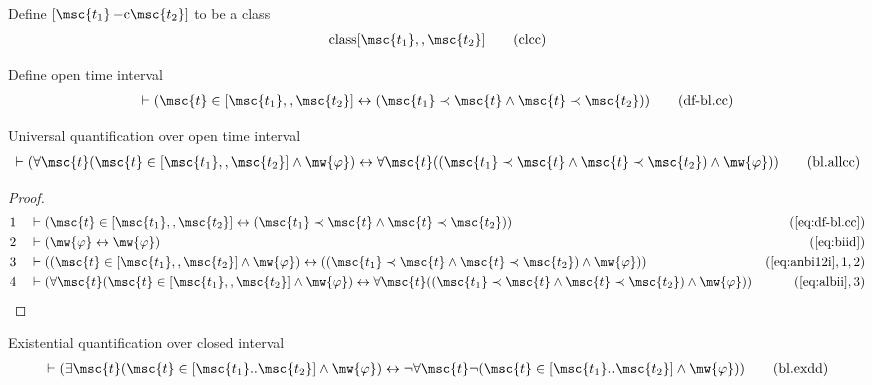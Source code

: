 \begin{metadefinition} Define $[ \msc{t_1} \,\mathrm{{\tt -}c}
\msc{t_2} ]$ to be a class
\begin{align}
{\rm class} [ \msc{t_1} ,, \msc{t_2} ]\label{eq:clcc}\tag{clcc}
\end{align}
\end{metadefinition}

\begin{metadefinition} Define open time interval
\begin{align}
\vdash ( \msc{t} \in [ \msc{t_1} ,, \msc{t_2} ] \leftrightarrow ( \msc{t_1}
    \prec \msc{t} \wedge \msc{t} \prec \msc{t_2} )
    )\label{eq:df-bl.cc}\tag{df-bl.cc}
\end{align}
\end{metadefinition}

\begin{lemma} Universal quantification over open time
interval
\begin{align}
\vdash ( \forall \msc{t} ( \msc{t} \in [ \msc{t_1} ,, \msc{t_2} ] \wedge
    \mw{\varphi} ) \leftrightarrow \forall \msc{t} ( ( \msc{t_1} \prec \msc{t}
    \wedge \msc{t} \prec \msc{t_2} ) \wedge \mw{\varphi} )
    )\label{eq:bl.allcc}\tag{bl.allcc}
\end{align}
\end{lemma}

\begin{proof}
\begin{align}
  1 &&  & \vdash ( \msc{t} \in [ \msc{t_1} ,, \msc{t_2} ] \leftrightarrow ( \msc{t_1} \prec \msc{t} \wedge \msc{t} \prec \msc{t_2} ) )&(\mbox{\ref{eq:df-bl.cc}})\notag
  \\ 2 &&  & \vdash ( \mw{\varphi} \leftrightarrow \mw{\varphi} )&(\mbox{\ref{eq:biid}})\notag
  \\ 3 &&  & \vdash ( ( \msc{t} \in [ \msc{t_1} ,, \msc{t_2} ] \wedge \mw{\varphi} ) \leftrightarrow ( ( \msc{t_1} \prec \msc{t} \wedge \msc{t} \prec \msc{t_2} ) \wedge \mw{\varphi} ) )&(\mbox{\ref{eq:anbi12i}},1,2)\notag
  \\ 4 &&  & \vdash ( \forall \msc{t} ( \msc{t} \in [ \msc{t_1} ,, \msc{t_2} ] \wedge \mw{\varphi} ) \leftrightarrow \forall \msc{t} ( ( \msc{t_1} \prec \msc{t} \wedge \msc{t} \prec \msc{t_2} ) \wedge \mw{\varphi} ) )&(\mbox{\ref{eq:albii}},3)\notag
\end{align}
\end{proof}

\begin{lemma} Existential quantification over closed
interval
\begin{align}
\vdash ( \exists \msc{t} ( \msc{t} \in [ \msc{t_1} .. \msc{t_2} ] \wedge
    \mw{\varphi} ) \leftrightarrow \lnot \forall \msc{t} \lnot ( \msc{t} \in [
    \msc{t_1} .. \msc{t_2} ] \wedge \mw{\varphi} )
    )\label{eq:bl.exdd}\tag{bl.exdd}
\end{align}
\end{lemma}

